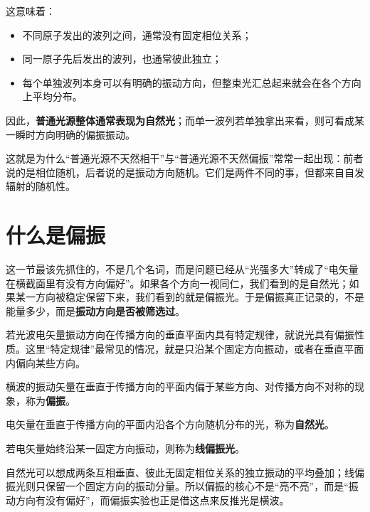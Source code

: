 \documentclass[lang=cn,11pt]{elegantbook}
\begin{document}
这意味着：
\begin{itemize}
 \item 不同原子发出的波列之间，通常没有固定相位关系；
 \item 同一原子先后发出的波列，也通常彼此独立；
 \item 每个单独波列本身可以有明确的振动方向，但整束光汇总起来就会在各个方向上平均分布。
\end{itemize}

因此，\textbf{普通光源整体通常表现为自然光}；而单一波列若单独拿出来看，则可看成某一瞬时方向明确的偏振振动。

\begin{remark}
这就是为什么“普通光源不天然相干”与“普通光源不天然偏振”常常一起出现：前者说的是相位随机，后者说的是振动方向随机。它们是两件不同的事，但都来自自发辐射的随机性。
\end{remark}

\section{什么是偏振}

这一节最该先抓住的，不是几个名词，而是问题已经从“光强多大”转成了“电矢量在横截面里有没有方向偏好”。如果各个方向一视同仁，我们看到的是自然光；如果某一方向被稳定保留下来，我们看到的就是偏振光。于是偏振真正记录的，不是能量多少，而是\textbf{振动方向是否被筛选过}。

若光波电矢量振动方向在传播方向的垂直平面内具有特定规律，就说光具有偏振性质。这里“特定规律”最常见的情况，就是只沿某个固定方向振动，或者在垂直平面内偏向某些方向。

\begin{definition}[偏振]\label{def:polarization}
横波的振动矢量在垂直于传播方向的平面内偏于某些方向、对传播方向不对称的现象，称为\textbf{偏振}。
\end{definition}

\begin{definition}[自然光]\label{def:natural-light}
电矢量在垂直于传播方向的平面内沿各个方向随机分布的光，称为\textbf{自然光}。
\end{definition}

\begin{definition}[线偏振光]\label{def:linearly-polarized-light}
若电矢量始终沿某一固定方向振动，则称为\textbf{线偏振光}。
\end{definition}

\begin{note}
自然光可以想成两条互相垂直、彼此无固定相位关系的独立振动的平均叠加；线偏振光则只保留一个固定方向的振动分量。所以偏振的核心不是“亮不亮”，而是“振动方向有没有偏好”，而偏振实验也正是借这点来反推光是横波。
\end{note}
\end{document}

